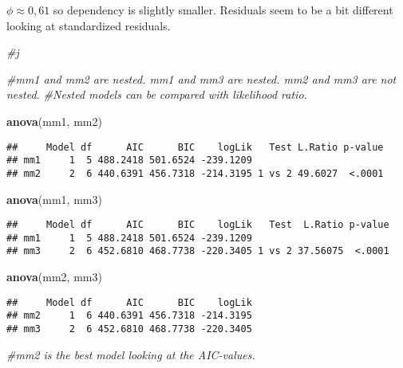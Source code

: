 \documentclass[
]{article}
\newenvironment{Shaded}{\begin{snugshade}}{\end{snugshade}}
\newcommand{\CommentTok}[1]{\textcolor[rgb]{0.56,0.35,0.01}{\textit{#1}}}
\newcommand{\FunctionTok}[1]{\textcolor[rgb]{0.13,0.29,0.53}{\textbf{#1}}}
\newcommand{\NormalTok}[1]{#1}
\begin{document}
\(\phi \approx 0,61\) so dependency is slightly smaller. Residuals seem
to be a bit different looking at standardized residuals.

\begin{Shaded}
\begin{Highlighting}[]
\CommentTok{\#j}

\CommentTok{\#mm1 and mm2 are nested. mm1 and mm3 are nested. mm2 and mm3 are not nested.}
\CommentTok{\#Nested models can be compared with likelihood ratio.}

\FunctionTok{anova}\NormalTok{(mm1, mm2)}
\end{Highlighting}
\end{Shaded}

\begin{verbatim}
##     Model df      AIC      BIC    logLik   Test L.Ratio p-value
## mm1     1  5 488.2418 501.6524 -239.1209                       
## mm2     2  6 440.6391 456.7318 -214.3195 1 vs 2 49.6027  <.0001
\end{verbatim}

\begin{Shaded}
\begin{Highlighting}[]
\FunctionTok{anova}\NormalTok{(mm1, mm3)}
\end{Highlighting}
\end{Shaded}

\begin{verbatim}
##     Model df      AIC      BIC    logLik   Test  L.Ratio p-value
## mm1     1  5 488.2418 501.6524 -239.1209                        
## mm3     2  6 452.6810 468.7738 -220.3405 1 vs 2 37.56075  <.0001
\end{verbatim}

\begin{Shaded}
\begin{Highlighting}[]
\FunctionTok{anova}\NormalTok{(mm2, mm3)}
\end{Highlighting}
\end{Shaded}

\begin{verbatim}
##     Model df      AIC      BIC    logLik
## mm2     1  6 440.6391 456.7318 -214.3195
## mm3     2  6 452.6810 468.7738 -220.3405
\end{verbatim}

\begin{Shaded}
\begin{Highlighting}[]
\CommentTok{\#mm2 is the best model looking at the AIC{-}values.}
\end{Highlighting}
\end{Shaded}
\end{document}
